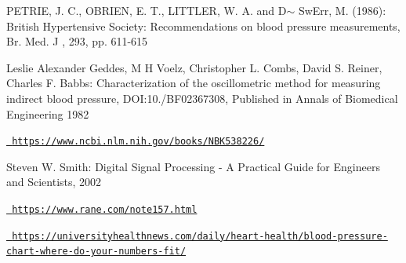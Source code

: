 \begin{DoxyEnumerate}
\item P\+E\+T\+R\+IE, J. C., O\textquotesingle{}B\+R\+I\+EN, E. T., L\+I\+T\+T\+L\+ER, W. A. and D$\sim$ Sw\+Err, M. (1986)\+: \textquotesingle{}British Hypertensive Society\+: Recommendations on blood pressure measurements\textquotesingle{}, Br. Med. J , 293, pp. 611-\/615
\item Leslie Alexander Geddes, M H Voelz, Christopher L. Combs, David S. Reiner, Charles F. Babbs\+: Characterization of the oscillometric method for measuring indirect blood pressure, D\+OI\+:10./\+B\+F02367308, Published in Annals of Biomedical Engineering 1982
\item \href{https://www.ncbi.nlm.nih.gov/books/NBK538226/}{\texttt{ https\+://www.\+ncbi.\+nlm.\+nih.\+gov/books/\+N\+B\+K538226/}}
\item Steven W. Smith\+: Digital Signal Processing -\/ A Practical Guide for Engineers and Scientists, 2002
\item \href{https://www.rane.com/note157.html}{\texttt{ https\+://www.\+rane.\+com/note157.\+html}}
\item \href{https://universityhealthnews.com/daily/heart-health/blood-pressure-chart-where-do-your-numbers-fit/}{\texttt{ https\+://universityhealthnews.\+com/daily/heart-\/health/blood-\/pressure-\/chart-\/where-\/do-\/your-\/numbers-\/fit/}} 
\end{DoxyEnumerate}